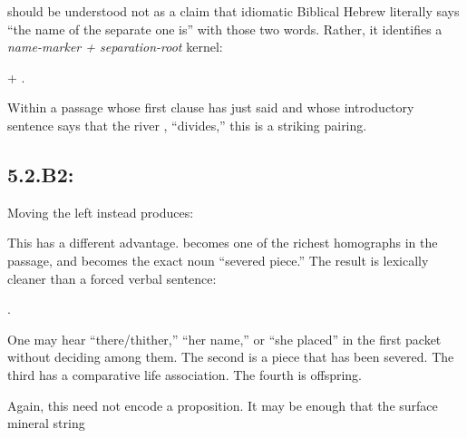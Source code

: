 should be understood not as a claim that idiomatic Biblical Hebrew literally says ``the name of the separate one is'' with those two words.  Rather, it identifies a \emph{name-marker + separation-root} kernel:

\begin{center}
 \quad + \quad {}.
\end{center}

Within a passage whose first clause has just said  and whose introductory sentence says that the river , ``divides,'' this is a striking pairing.

\subsection*{5.2.\quad B2: }

Moving the  left instead produces:


This has a different advantage.   becomes one of the richest homographs in the passage, and  becomes the exact noun ``severed piece.''  The result is lexically cleaner than a forced verbal sentence:

\begin{center}
 \quad {} \quad {} \quad {}.
\end{center}

One may hear ``there/thither,'' ``her name,'' or ``she placed'' in the first packet without deciding among them.  The second is a piece that has been severed.  The third has a comparative life association.  The fourth is offspring.

Again, this need not encode a proposition.  It may be enough that the surface mineral string


